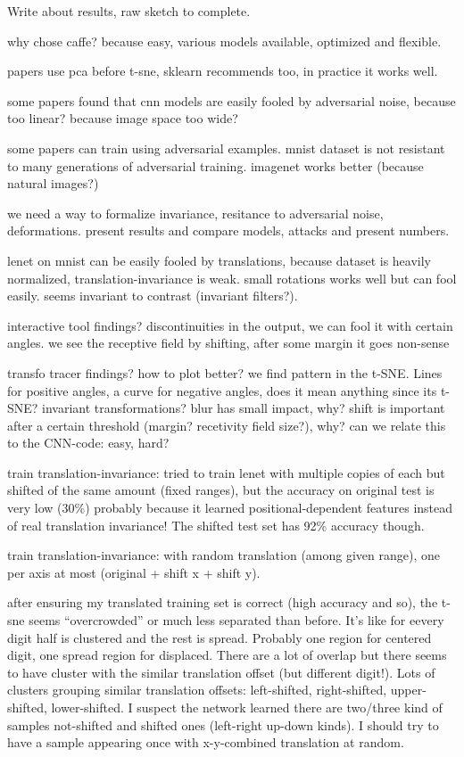 \documentclass[a4paper,12pt]{article}
\begin{document}
Write about results, raw sketch to complete.

why chose caffe? because easy, various models available, optimized and flexible.

papers use pca before t-sne, sklearn recommends too, in practice it works well.

some papers found that cnn models are easily fooled by adversarial noise, because too linear? because image space too wide?

some papers can train using adversarial examples. mnist dataset is not resistant to many generations of adversarial training. imagenet works better (because natural images?)

we need a way to formalize invariance, resitance to adversarial noise, deformations. present results and compare models, attacks and present numbers.

lenet on mnist can be easily fooled by translations, because dataset is heavily normalized, translation-invariance is weak. small rotations works well but can fool easily. seems invariant to contrast (invariant filters?).

interactive tool findings? discontinuities in the output, we can fool it with certain angles. we see the receptive field by shifting, after some margin it goes non-sense

transfo tracer findings? how to plot better? we find pattern in the t-SNE. Lines for positive angles, a curve for negative angles, does it mean anything since its t-SNE? invariant transformations? blur has small impact, why? shift is important after a certain threshold (margin? recetivity field size?), why? can we relate this to the CNN-code: easy, hard?

train translation-invariance: tried to train lenet with multiple copies of each but shifted of the same amount (fixed ranges), but the accuracy on original test is very low (30\%) probably because it learned positional-dependent features instead of real translation invariance! The shifted test set has 92\% accuracy though.

train translation-invariance: with random translation (among given range), one per axis at most (original + shift x + shift y).

after ensuring my translated training set is correct (high accuracy and so), the t-sne seems ``overcrowded'' or much less separated than before. It's like for eevery digit half is clustered and the rest is spread. Probably one region for centered digit, one spread region for displaced. There are a lot of overlap but there seems to have cluster with the similar translation offset (but different digit!). Lots of clusters grouping similar translation offsets: left-shifted, right-shifted, upper-shifted, lower-shifted. I suspect the network learned there are two/three kind of samples not-shifted and shifted ones (left-right up-down kinds). I should try to have a sample appearing once with x-y-combined translation at random.
\end{document}
